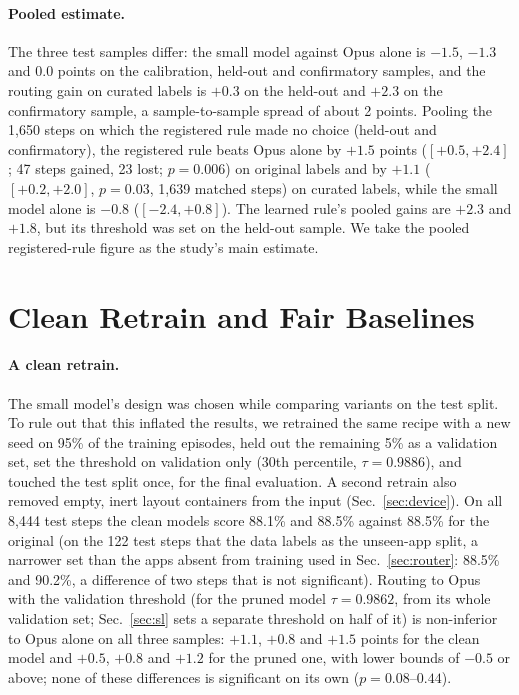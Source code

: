 \documentclass[10pt]{article}
\begin{document}
\paragraph{Pooled estimate.} The three test samples differ: the small model against Opus alone is $-1.5$, $-1.3$ and $0.0$ points on the calibration, held-out and confirmatory samples, and the routing gain on curated labels is $+0.3$ on the held-out and $+2.3$ on the confirmatory sample, a sample-to-sample spread of about 2 points. Pooling the 1{,}650 steps on which the registered rule made no choice (held-out and confirmatory), the registered rule beats Opus alone by $+1.5$ points ($[+0.5, +2.4]$; 47 steps gained, 23 lost; $p=0.006$) on original labels and by $+1.1$ ($[+0.2, +2.0]$, $p=0.03$, 1{,}639 matched steps) on curated labels, while the small model alone is $-0.8$ ($[-2.4, +0.8]$). The learned rule's pooled gains are $+2.3$ and $+1.8$, but its threshold was set on the held-out sample. We take the pooled registered-rule figure as the study's main estimate.

\section{Clean Retrain and Fair Baselines}\label{sec:fair}
\paragraph{A clean retrain.} The small model's design was chosen while comparing variants on the test split. To rule out that this inflated the results, we retrained the same recipe with a new seed on 95\% of the training episodes, held out the remaining 5\% as a validation set, set the threshold on validation only (30th percentile, $\tau=0.9886$), and touched the test split once, for the final evaluation. A second retrain also removed empty, inert layout containers from the input (Sec.~\ref{sec:device}). On all 8{,}444 test steps the clean models score 88.1\% and 88.5\% against 88.5\% for the original (on the 122 test steps that the data labels as the unseen-app split, a narrower set than the apps absent from training used in Sec.~\ref{sec:router}: 88.5\% and 90.2\%, a difference of two steps that is not significant). Routing to Opus with the validation threshold (for the pruned model $\tau=0.9862$, from its whole validation set; Sec.~\ref{sec:sl} sets a separate threshold on half of it) is non-inferior to Opus alone on all three samples: $+1.1$, $+0.8$ and $+1.5$ points for the clean model and $+0.5$, $+0.8$ and $+1.2$ for the pruned one, with lower bounds of $-0.5$ or above; none of these differences is significant on its own ($p=0.08$--$0.44$).
\end{document}
